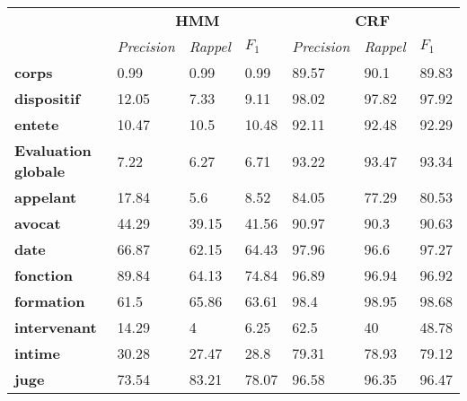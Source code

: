 \begin{table}[!ht]
	\scriptsize
	\centering
	\begin{tabular}{|l|l|l|l|l|l|l|}
		\hline
	\multirow{2}{*}{}	& \multicolumn{3}{c}{\textbf{HMM}}  &      \multicolumn{3}{|c|}{\textbf{CRF}}          \\ \cline{2-7}
		& \textit{Precision} & \textit{Rappel} & $F_1$ & \textit{Precision} & \textit{Rappel} & $F_1$ \\ \hline
		\textbf{corps}         & 0.99               & 0.99            & 0.99        & 89.57              & 90.1            & 89.83       \\ 
		\textbf{dispositif}    & 12.05              & 7.33            & 9.11        & 98.02              & 97.82           & 97.92       \\ 
		\textbf{entete}        & 10.47              & 10.5            & 10.48       & 92.11              & 92.48           & 92.29       \\ \hline
		\textbf{Evaluation globale} & 7.22               & 6.27            & 6.71        & 93.22              & 93.47           & 93.34       \\ \hline
				\noalign{\smallskip}\hline\noalign{\smallskip}
		\textbf{appelant}      & 17.84              & 5.6             & 8.52        & 84.05              & 77.29           & 80.53       \\ 
		\textbf{avocat}        & 44.29              & 39.15           & 41.56       & 90.97              & 90.3            & 90.63       \\ 
		\textbf{date}          & 66.87              & 62.15           & 64.43       & 97.96              & 96.6            & 97.27       \\ 
		\textbf{fonction}      & 89.84              & 64.13           & 74.84       & 96.89              & 96.94           & 96.92       \\ 
		\textbf{formation}     & 61.5               & 65.86           & 63.61       & 98.4               & 98.95           & 98.68       \\ 
		\textbf{intervenant}   & 14.29              & 4               & 6.25        & 62.5               & 40              & 48.78       \\ 
		\textbf{intime}        & 30.28              & 27.47           & 28.8        & 79.31              & 78.93           & 79.12       \\ 
		\textbf{juge}          & 73.54              & 83.21           & 78.07       & 96.58              & 96.35           & 96.47       \\ 

\end{tabular}
\end{table}
